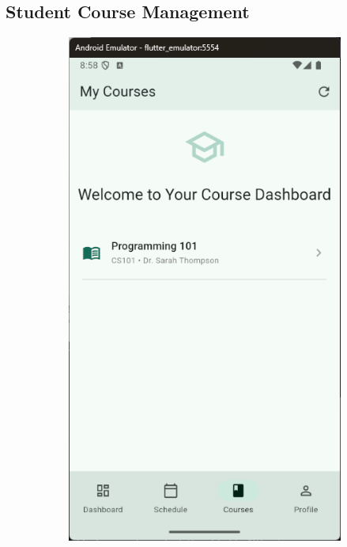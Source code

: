 \subsection{Student Course Management}\nopagebreak[4]
\vspace{0.5cm}
\begin{figure}[H]
    \centering
    \begin{subfigure}[b]{0.35\textwidth}
        \includegraphics[width=\textwidth]{images/rachid/student-side-courses-home-1.png}

\end{subfigure}
\end{figure}
